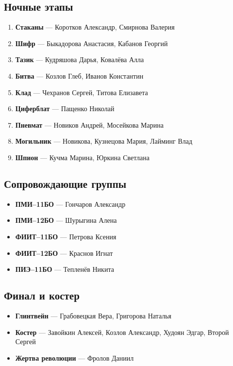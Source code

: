 \subsection*{Ночные этапы}
\begin{enumerate}
\item \textbf{Стаканы} --- Коротков Александр, Смирнова Валерия 
\item \textbf{Шифр} --- Быкадорова Анастасия, Кабанов Георгий 
\item \textbf{Тазик} --- Кудряшова Дарья, Ковалёва Алла 
\item \textbf{Битва} --- Козлов Глеб, Иванов Константин 
\item \textbf{Клад} --- Чехранов Сергей, Титова Елизавета 
\item \textbf{Циферблат} --- Пащенко Николай 
\item \textbf{Пневмат} --- Новиков Андрей, Мосейкова Марина
\item \textbf{Могильник} --- Новикова, Кузнецова Мария, Лайминг Влад
\item \textbf{Шпион} --- Кучма Марина, Юркина Светлана 
\end{enumerate}

\subsection*{Сопровождающие группы}
\begin{itemize}
\item \textbf{ПМИ--11БО} --- Гончаров Александр
\item \textbf{ПМИ--12БО} --- Шурыгина Алена
\item \textbf{ФИИТ--11БО} --- Петрова Ксения
\item \textbf{ФИИТ--12БО} --- Краснов Игнат
\item \textbf{ПИЭ--11БО} --- Тепленёв Никита
\end{itemize}

\subsection*{Финал и костер}
\begin{itemize}
\item \textbf{Глинтвейн} --- Грабовецкая Вера, Григорова Наталья
\item \textbf{Костер} --- Завойкин Алексей, Козлов Александр, Худоян Эдгар, Второй Сергей
\item \textbf{Жертва революции} --- Фролов Даниил
\end{itemize}

